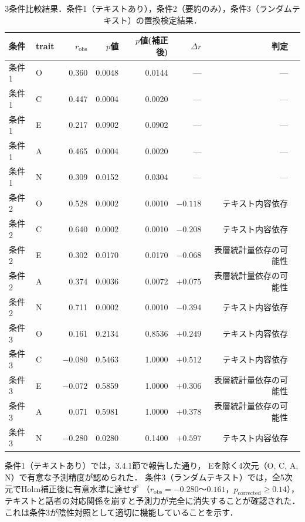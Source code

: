 \documentclass[dvipdfmx,11pt,a4paper]{bxjsarticle}
\renewcommand{\_}{\paperorigunderscore\allowbreak}%
\begin{document}
\begin{table}[htbp]
\centering
\caption{3条件比較結果．条件1（テキストあり），条件2（要約のみ），条件3（ランダムテキスト）の置換検定結果．}
\label{tab:baseline_comparison}
\begin{tabular}{llrrrrrl}
\toprule
条件 & trait & $r_{\text{obs}}$ & $p$値 & $p$値(補正後) & $\Delta r$ & 判定 \\
\midrule
条件1 & O & 0.360 & 0.0048 & 0.0144 & --- & --- \\
条件1 & C & 0.447 & 0.0004 & 0.0020 & --- & --- \\
条件1 & E & 0.217 & 0.0902 & 0.0902 & --- & --- \\
条件1 & A & 0.465 & 0.0004 & 0.0020 & --- & --- \\
条件1 & N & 0.309 & 0.0152 & 0.0304 & --- & --- \\
\midrule
条件2 & O & 0.528 & 0.0002 & 0.0010 & $-0.118$ & テキスト内容依存 \\
条件2 & C & 0.640 & 0.0002 & 0.0010 & $-0.208$ & テキスト内容依存 \\
条件2 & E & 0.302 & 0.0170 & 0.0170 & $-0.068$ & 表層統計量依存の可能性 \\
条件2 & A & 0.374 & 0.0036 & 0.0072 & $+0.075$ & 表層統計量依存の可能性 \\
条件2 & N & 0.711 & 0.0002 & 0.0010 & $-0.394$ & テキスト内容依存 \\
\midrule
条件3 & O & 0.161 & 0.2134 & 0.8536 & $+0.249$ & テキスト内容依存 \\
条件3 & C & $-0.080$ & 0.5463 & 1.0000 & $+0.512$ & テキスト内容依存 \\
条件3 & E & $-0.072$ & 0.5859 & 1.0000 & $+0.306$ & 表層統計量依存の可能性 \\
条件3 & A & 0.071 & 0.5981 & 1.0000 & $+0.378$ & 表層統計量依存の可能性 \\
条件3 & N & $-0.280$ & 0.0280 & 0.1400 & $+0.597$ & テキスト内容依存 \\
\bottomrule
\end{tabular}
\end{table}

条件1（テキストあり）では，3.4.1節で報告した通り，
Eを除く4次元（O, C, A, N）で有意な予測精度が認められた．
条件3（ランダムテキスト）では，全5次元でHolm補正後に有意水準に達せず
（$r_{\text{obs}} = -0.280$〜$0.161$，$p_{\text{corrected}} \geq 0.14$），
テキストと話者の対応関係を崩すと予測力が完全に消失することが確認された．
これは条件3が陰性対照として適切に機能していることを示す．
\end{document}
